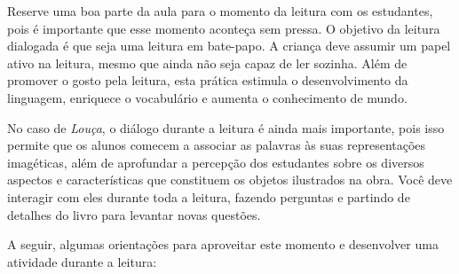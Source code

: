 \documentclass[11pt]{extarticle}
\begin{document}
Reserve uma boa parte da aula para o momento da leitura com os estudantes, 
pois é importante que esse momento aconteça sem pressa. O objetivo da 
leitura dialogada é que seja uma leitura em bate-papo. A criança deve 
assumir um papel ativo na leitura, mesmo que ainda não seja capaz de 
ler sozinha. Além de promover o gosto pela leitura, esta prática estimula 
o desenvolvimento da linguagem, enriquece o vocabulário e 
aumenta o conhecimento de mundo.


No caso de \textit{Louça}, o diálogo durante a leitura é 
ainda mais importante, pois isso permite que os alunos comecem a associar as palavras às suas representações imagéticas, além de aprofundar a percepção dos estudantes sobre os diversos aspectos e características que constituem os objetos ilustrados na obra.
Você deve interagir com eles durante toda a 
leitura, fazendo perguntas e partindo de detalhes do livro para 
levantar novas questões. 

A seguir, algumas orientações para aproveitar este momento e desenvolver uma atividade durante a leitura: 
\end{document}
